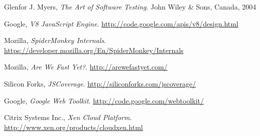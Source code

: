 \begin{thebibliography}{99}
Glenfor J. Myers,
\emph{The Art of Software Testing}.
John Wiley \& Sons, Canada,
2004

Google,
\emph{V8 JavaScript Engine}.
\url{http://code.google.com/apis/v8/design.html}

Mozilla,
\emph{SpiderMonkey Internals}.
\url{https://developer.mozilla.org/En/SpiderMonkey/Internals}

Mozilla,
\emph{Are We Fast Yet?}.
\url{http://arewefastyet.com/}

Silicon Forks,
\emph{JSCoverage}.
\url{http://siliconforks.com/jscoverage/}

Google,
\emph{Google Web Toolkit}.
\url{http://code.google.com/webtoolkit/}

Citrix Systems Inc.,
\emph{Xen Cloud Platform}.
\url{http://www.xen.org/products/cloudxen.html}

\end{thebibliography}
